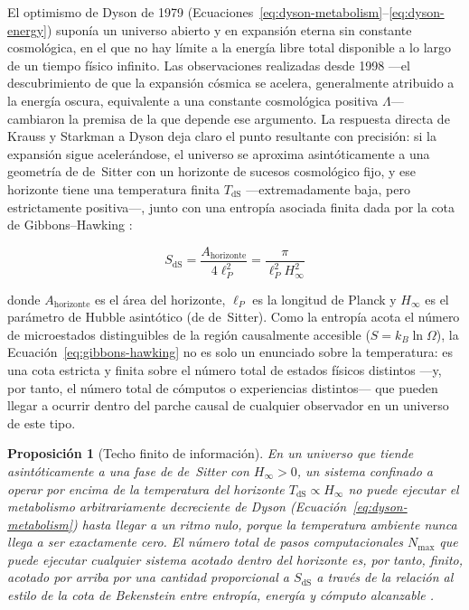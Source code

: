 \documentclass[11pt]{article}
\newtheorem{proposition}{Proposición}
\begin{document}
El optimismo de Dyson de 1979 (Ecuaciones~\ref{eq:dyson-metabolism}--\ref{eq:dyson-energy}) suponía un universo abierto y en expansión eterna sin constante cosmológica, en el que no hay límite a la energía libre total disponible a lo largo de un tiempo físico infinito. Las observaciones realizadas desde 1998 —el descubrimiento de que la expansión cósmica se acelera, generalmente atribuido a la energía oscura, equivalente a una constante cosmológica positiva $\Lambda$— cambiaron la premisa de la que depende ese argumento. La respuesta directa de Krauss y Starkman a Dyson \citep{krauss2000life} deja claro el punto resultante con precisión: si la expansión sigue acelerándose, el universo se aproxima asintóticamente a una geometría de de~Sitter con un horizonte de sucesos cosmológico fijo, y ese horizonte tiene una temperatura finita $T_{\text{dS}}$ —extremadamente baja, pero estrictamente positiva—, junto con una entropía asociada finita dada por la cota de Gibbons--Hawking \citep{gibbons1977cosmological}:

\begin{equation}
\label{eq:gibbons-hawking}
S_{\text{dS}} = \frac{A_{\text{horizonte}}}{4 \ell_P^2} = \frac{\pi}{\ell_P^2 H_\infty^2}
\end{equation}

\noindent donde $A_{\text{horizonte}}$ es el área del horizonte, $\ell_P$ es la longitud de Planck y $H_\infty$ es el parámetro de Hubble asintótico (de de~Sitter). Como la entropía acota el número de microestados distinguibles de la región causalmente accesible ($S = k_B \ln \Omega$), la Ecuación~\ref{eq:gibbons-hawking} no es solo un enunciado sobre la temperatura: es una cota estricta y finita sobre el número total de estados físicos distintos —y, por tanto, el número total de cómputos o experiencias distintos— que pueden llegar a ocurrir dentro del parche causal de cualquier observador en un universo de este tipo.

\begin{proposition}[Techo finito de información]
\label{prop:ceiling}
En un universo que tiende asintóticamente a una fase de de~Sitter con $H_\infty > 0$, un sistema confinado a operar por encima de la temperatura del horizonte $T_{\text{dS}} \propto H_\infty$ no puede ejecutar el metabolismo arbitrariamente decreciente de Dyson (Ecuación~\ref{eq:dyson-metabolism}) hasta llegar a un ritmo nulo, porque la temperatura ambiente nunca llega a ser exactamente cero. El número total de pasos computacionales $N_{\max}$ que puede ejecutar cualquier sistema acotado dentro del horizonte es, por tanto, finito, acotado por arriba por una cantidad proporcional a $S_{\text{dS}}$ a través de la relación al estilo de la cota de Bekenstein entre entropía, energía y cómputo alcanzable \citep{lloyd2000ultimate}.
\end{proposition}
\end{document}
